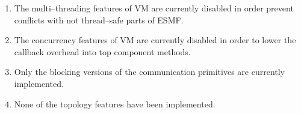 

\begin{enumerate}

\item The multi--threading features of VM are currently disabled in order prevent conflicts with not thread--safe parts of ESMF. 

\item The concurrency features of VM are currently disabled in order to lower the callback overhead into top component methods. 

\item Only the blocking versions of the communication primitives are currently implemented.

\item None of the topology features have been implemented.

\end{enumerate}


